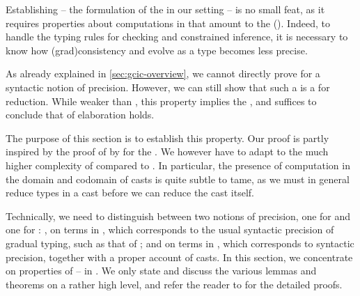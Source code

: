 Establishing  – the formulation of
the   in our setting – is no small feat, as it
requires properties about
computations in  that amount to the  ().
Indeed, to handle
the typing rules for checking and constrained inference, it is
necessary to know how \kl(grad){consistency} and  evolve as a type
becomes less precise.

As already explained in \cref{sec:gcic-overview}, we
cannot directly prove  for a syntactic notion of
precision. However, we can still show that such a 
is a  for reduction.
While weaker than , this property implies the ,
and suffices to conclude that  of elaboration holds.

The purpose of this section is to establish this property.
Our proof is partly inspired by the proof of  by
 for the .%
We however have to adapt to the much higher complexity of  compared to .
In particular, the presence of computation in the domain and codomain of casts is quite subtle
to tame, as we must in general reduce types in a cast before we can reduce the cast itself.%

\AP Technically, we need to distinguish between two notions of precision,
one for  and one for :
, on terms in , which corresponds to the
usual syntactic precision of gradual typing, such as that of \textcite{Siek2015};
and  on terms in , which corresponds
to syntactic precision, together with a proper account of casts.
In this section, we concentrate on properties of  – in . 
We only state and discuss the various lemmas and
theorems on a rather high level, and refer the reader to
 for the detailed proofs.

